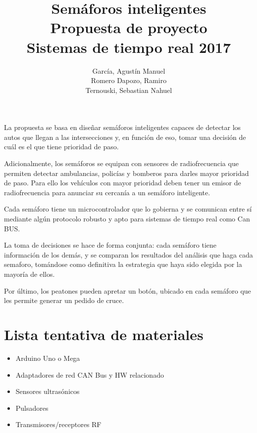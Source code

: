 \documentclass[a4paper,11pt]{article}
\title{Semáforos inteligentes
		\\{\large Propuesta de proyecto\\ Sistemas de tiempo real 2017}}
\author{García, Agustín Manuel
\\Romero Dapozo, Ramiro
\\Ternouski, Sebastian Nahuel}
\date{}
\begin{document}
\maketitle

La propuesta se basa en diseñar semáforos inteligentes capaces de detectar los autos que llegan a las intersecciones y, en función de eso, tomar una decisión de cuál es el que tiene prioridad de paso.

Adicionalmente, los semáforos se equipan con sensores de radiofrecuencia que permiten detectar ambulancias, policías y bomberos para darles mayor prioridad de paso.
Para ello los vehículos con mayor prioridad deben tener un emisor de radiofrecuencia para anunciar su cercanía a un semáforo inteligente. 

Cada semáforo tiene un microcontrolador que lo gobierna y se comunican entre sí mediante algún protocolo robusto y apto para sistemas de tiempo real como Can BUS.

La toma de decisiones se hace de forma conjunta: cada semáforo tiene información de los demás, y se comparan los resultados del análisis que haga cada semaforo, tomándose como definitiva la estrategia que haya sido elegida por la mayoría de ellos.

Por último, los peatones pueden apretar un botón, ubicado en cada semáforo que les permite generar un pedido de cruce.

\section*{Lista tentativa de materiales}
\begin{itemize}
	\item Arduino Uno o Mega
	\item Adaptadores de red CAN Bus y HW relacionado
	\item Sensores ultrasónicos
	\item Pulsadores
	\item Transmisores/receptores RF
\end{itemize}
\end{document}
